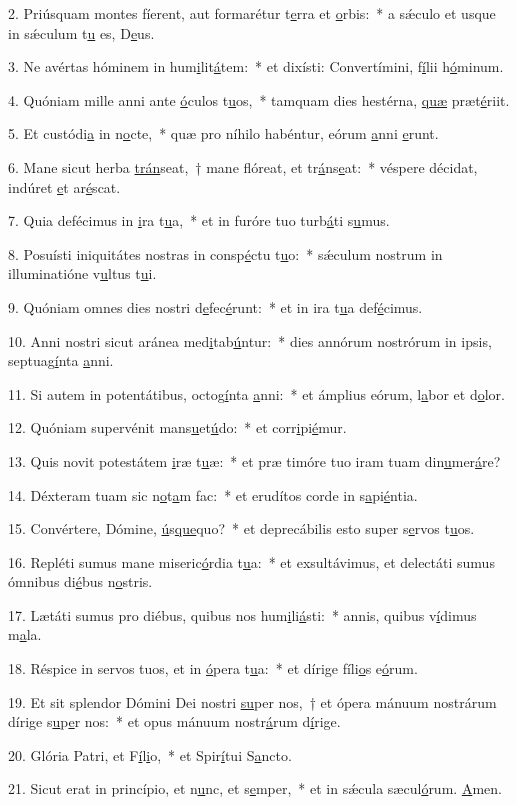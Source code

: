 2. Priúsquam montes fíerent, aut formarétur t\uline{e}rra et \uline{o}rbis:~* a sǽculo et usque in sǽculum t\uline{u} es, D\uline{e}us.\par 
3. Ne avértas hóminem in hum\uline{i}lit\uline{á}tem:~* et dixísti: Convertímini, f\uline{í}lii h\uline{ó}minum.\par 
4. Quóniam mille anni ante \uline{ó}culos t\uline{u}os,~* tamquam dies hestérna, \uline{quæ} præt\uline{é}riit.\par 
5. Et custódi\uline{a} in n\uline{o}cte,~* quæ pro níhilo habéntur, eórum \uline{a}nni \uline{e}runt.\par 
6. Mane sicut herba \uline{trán}seat,~† mane flóreat, et tr\uline{á}ns\uline{e}at:~* véspere décidat, indúret \uline{e}t ar\uline{é}scat.\par 
7. Quia defécimus in \uline{i}ra t\uline{u}a,~* et in furóre tuo turb\uline{á}ti s\uline{u}mus.\par 
8. Posuísti iniquitátes nostras in consp\uline{é}ctu t\uline{u}o:~* sǽculum nostrum in illuminatióne v\uline{u}ltus t\uline{u}i.\par 
9. Quóniam omnes dies nostri d\uline{e}fec\uline{é}runt:~* et in ira t\uline{u}a def\uline{é}cimus.\par 
10. Anni nostri sicut aránea med\uline{i}tab\uline{ú}ntur:~* dies annórum nostrórum in ipsis, septuag\uline{í}nta \uline{a}nni.\par 
11. Si autem in potentátibus, octog\uline{í}nta \uline{a}nni:~* et ámplius eórum, l\uline{a}bor et d\uline{o}lor.\par 
12. Quóniam supervénit mans\uline{u}et\uline{ú}do:~* et corr\uline{i}pi\uline{é}mur.\par 
13. Quis novit potestátem \uline{i}ræ t\uline{u}æ:~* et præ timóre tuo iram tuam din\uline{u}mer\uline{á}re?\par 
14. Déxteram tuam sic n\uline{o}t\uline{a}m fac:~* et erudítos corde in s\uline{a}pi\uline{é}ntia.\par 
15. Convértere, Dómine, \uline{ú}s\uline{que}quo?~* et deprecábilis esto super s\uline{e}rvos t\uline{u}os.\par 
16. Repléti sumus mane miseric\uline{ó}rdia t\uline{u}a:~* et exsultávimus, et delectáti sumus ómnibus di\uline{é}bus n\uline{o}stris.\par 
17. Lætáti sumus pro diébus, quibus nos hum\uline{i}li\uline{á}sti:~* annis, quibus v\uline{í}dimus m\uline{a}la.\par 
18. Réspice in servos tuos, et in \uline{ó}pera t\uline{u}a:~* et dírige fíli\uline{o}s e\uline{ó}rum.\par 
19. Et sit splendor Dómini Dei nostri \uline{su}per nos,~† et ópera mánuum nostrárum dírige s\uline{u}p\uline{e}r nos:~* et opus mánuum nostr\uline{á}rum d\uline{í}rige.\par 
20. Glória Patri, et F\uline{í}l\uline{i}o,~* et Spir\uline{í}tui S\uline{a}ncto.\par 
21. Sicut erat in princípio, et n\uline{u}nc, et s\uline{e}mper,~* et in sǽcula sæcul\uline{ó}rum. \uline{A}men.\par 
